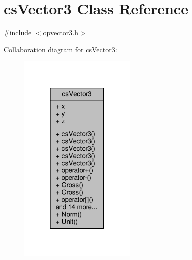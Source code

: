 \hypertarget{classcsVector3}{}\section{cs\+Vector3 Class Reference}
\label{classcsVector3}


{\ttfamily \#include $<$opvector3.\+h$>$}



Collaboration diagram for cs\+Vector3\+:
\nopagebreak
\begin{figure}[H]
\begin{center}
\leavevmode
\includegraphics[width=160pt]{de/da9/classcsVector3__coll__graph}
\end{center}
\end{figure}
